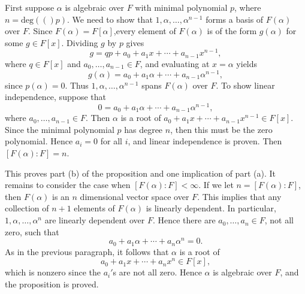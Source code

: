 \documentclass{article}
\makeatletter
\newcommand{\deg}[1]{\text{deg}(#1)}
\theoremstyle{definition}
\theoremstyle{remark}
\let\oldproofname=\proofname
\renewcommand{\proofname}{\textit{\oldproofname}}
\theoremstyle{definition}
\renewenvironment{proof}[1][\proofname]{\par
  \pushQED{\qed}%
  \normalfont \topsep6\p@\@plus6\p@\relax
  \list{}{\leftmargin=0mm
          \rightmargin=0mm
          \settowidth{\itemindent}{\itshape#1}%
          \labelwidth=\itemindent
          \parsep=0pt \listparindent=0mm%
  }
  \item[\hskip\labelsep
        \itshape
    #1\@addpunct{.}]\ignorespaces
}{%
  \popQED\endlist\@endpefalse
}
\makeatother
\begin{document}
        \begin{proof}
            First suppose $\alpha$ is algebraic over $F$ with minimal polynomial $p$, where $n=\deg(p)$. We need to show that $1,\alpha,\dots,\alpha^{n-1}$ forms a basis of $F(\alpha)$ over $F$. Since $F(\alpha)=F[\alpha]$,every element of $F(\alpha)$ is of the form $g(\alpha)$ for some $g\in F[x]$. Dividing $g$ by $p$ gives
                \begin{equation*}
                    g=qp+a_0+a_1x+\cdots+a_{n-1}x^{n-1},
                \end{equation*}
            where $q\in F[x]$ and $a_0,\dots,a_{n-1}\in F$, and evaluating at $x=\alpha$ yields 
                \begin{equation*}
                    g(\alpha)=a_0+a_1\alpha+\cdots+a_{n-1}\alpha^{n-1},
                \end{equation*}
            since $p(\alpha)=0$. Thus $1,\alpha,\dots,\alpha^{n-1}$ spans $F(\alpha)$ over $F$. To show linear independence, suppose that 
                \begin{equation*}
                    0=a_0+a_1\alpha+\cdots+a_{n-1}\alpha^{n-1},
                \end{equation*}
            where $a_0,\dots,a_{n-1}\in F$. Then $\alpha$ is a root of $a_0+a_1x+\cdots+a_{n-1}x^{n-1}\in F[x]$. Since the minimal polynomial $p$ has degree $n$, then this must be the zero polynomial. Hence $a_i=0$ for all $i$, and linear independence is proven. Then $[F(\alpha)\colon F]=n$.\par\hspace{4mm}This proves part (b) of the proposition and one implication of part (a). It remains to consider the case when $[F(\alpha)\colon F]<\infty$. If we let $n=[F(\alpha)\colon F]$, then $F(\alpha)$ is an $n$ dimensional vector space over $F$. This implies that any collection of $n+1$ elements of $F(\alpha)$ is linearly dependent. In particular, $1,\alpha,\dots,\alpha^n$ are linearly dependent over $F$. Hence there are $a_0,\dots,a_n\in F$, not all zero, such that     \begin{equation*}
                a_0+a_1\alpha+\cdots+a_n\alpha^n=0.
            \end{equation*}
            As in the previous paragraph, it follows that $\alpha$ is a root of 
                \begin{equation*}
                    a_0+a_1x+\cdots+a_nx^n\in F[x],
                \end{equation*}
            which is nonzero since the $a_i'$s are not all zero. Hence $\alpha$ is algebraic over $F$, and the proposition is proved.
        \end{proof}
\end{document}
